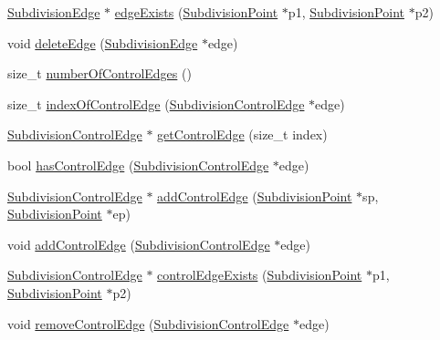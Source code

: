 \begin{DoxyCompactItemize}
\hyperlink{classShipCAD_1_1SubdivisionEdge}{Subdivision\-Edge} $\ast$ \hyperlink{classShipCAD_1_1SubdivisionSurface_adfdeabdc19eb55a7ba4ab0b607207300}{edge\-Exists} (\hyperlink{classShipCAD_1_1SubdivisionPoint}{Subdivision\-Point} $\ast$p1, \hyperlink{classShipCAD_1_1SubdivisionPoint}{Subdivision\-Point} $\ast$p2)
\item 
void \hyperlink{classShipCAD_1_1SubdivisionSurface_abb5beb9a6fc413e8d713e18fb39bf2ba}{delete\-Edge} (\hyperlink{classShipCAD_1_1SubdivisionEdge}{Subdivision\-Edge} $\ast$edge)
\item 
size\-\_\-t \hyperlink{classShipCAD_1_1SubdivisionSurface_a2fd710a2e2fa0272b8c8f498b8fc4f56}{number\-Of\-Control\-Edges} ()
\item 
size\-\_\-t \hyperlink{classShipCAD_1_1SubdivisionSurface_ae2f4e931f0134f8637e0aa769dba1d32}{index\-Of\-Control\-Edge} (\hyperlink{classShipCAD_1_1SubdivisionControlEdge}{Subdivision\-Control\-Edge} $\ast$edge)
\item 
\hyperlink{classShipCAD_1_1SubdivisionControlEdge}{Subdivision\-Control\-Edge} $\ast$ \hyperlink{classShipCAD_1_1SubdivisionSurface_ac7d6762dc83f1f114c1d7f4e67d8f8eb}{get\-Control\-Edge} (size\-\_\-t index)
\item 
bool \hyperlink{classShipCAD_1_1SubdivisionSurface_a9856bef9e5b2de9be4a3118fa80d0f16}{has\-Control\-Edge} (\hyperlink{classShipCAD_1_1SubdivisionControlEdge}{Subdivision\-Control\-Edge} $\ast$edge)
\item 
\hyperlink{classShipCAD_1_1SubdivisionControlEdge}{Subdivision\-Control\-Edge} $\ast$ \hyperlink{classShipCAD_1_1SubdivisionSurface_a976358235d20a0fdc83248948bb9cf48}{add\-Control\-Edge} (\hyperlink{classShipCAD_1_1SubdivisionPoint}{Subdivision\-Point} $\ast$sp, \hyperlink{classShipCAD_1_1SubdivisionPoint}{Subdivision\-Point} $\ast$ep)
\item 
void \hyperlink{classShipCAD_1_1SubdivisionSurface_acfec50abf57a44ed47038ecc55f5a600}{add\-Control\-Edge} (\hyperlink{classShipCAD_1_1SubdivisionControlEdge}{Subdivision\-Control\-Edge} $\ast$edge)
\item 
\hyperlink{classShipCAD_1_1SubdivisionControlEdge}{Subdivision\-Control\-Edge} $\ast$ \hyperlink{classShipCAD_1_1SubdivisionSurface_a6a89be4440e3adfcb0b14c164db891ae}{control\-Edge\-Exists} (\hyperlink{classShipCAD_1_1SubdivisionPoint}{Subdivision\-Point} $\ast$p1, \hyperlink{classShipCAD_1_1SubdivisionPoint}{Subdivision\-Point} $\ast$p2)
\item 
void \hyperlink{classShipCAD_1_1SubdivisionSurface_a3aac4d6c8ad638234f88fb8b1ffa00cb}{remove\-Control\-Edge} (\hyperlink{classShipCAD_1_1SubdivisionControlEdge}{Subdivision\-Control\-Edge} $\ast$edge)

\end{DoxyCompactItemize}
